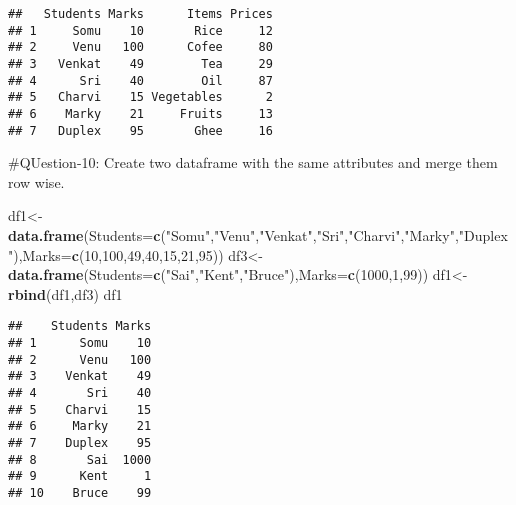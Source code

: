 \documentclass[
]{article}
\newenvironment{Shaded}{\begin{snugshade}}{\end{snugshade}}
\newcommand{\AttributeTok}[1]{\textcolor[rgb]{0.13,0.29,0.53}{#1}}
\newcommand{\DecValTok}[1]{\textcolor[rgb]{0.00,0.00,0.81}{#1}}
\newcommand{\FunctionTok}[1]{\textcolor[rgb]{0.13,0.29,0.53}{\textbf{#1}}}
\newcommand{\NormalTok}[1]{#1}
\newcommand{\OtherTok}[1]{\textcolor[rgb]{0.56,0.35,0.01}{#1}}
\newcommand{\StringTok}[1]{\textcolor[rgb]{0.31,0.60,0.02}{#1}}
\begin{document}
\begin{verbatim}
##   Students Marks      Items Prices
## 1     Somu    10       Rice     12
## 2     Venu   100      Cofee     80
## 3   Venkat    49        Tea     29
## 4      Sri    40        Oil     87
## 5   Charvi    15 Vegetables      2
## 6    Marky    21     Fruits     13
## 7   Duplex    95       Ghee     16
\end{verbatim}

\#QUestion-10: Create two dataframe with the same attributes and merge
them row wise.

\begin{Shaded}
\begin{Highlighting}[]
\NormalTok{df1}\OtherTok{\textless{}{-}}\FunctionTok{data.frame}\NormalTok{(}\AttributeTok{Students=}\FunctionTok{c}\NormalTok{(}\StringTok{"Somu"}\NormalTok{,}\StringTok{"Venu"}\NormalTok{,}\StringTok{"Venkat"}\NormalTok{,}\StringTok{"Sri"}\NormalTok{,}\StringTok{"Charvi"}\NormalTok{,}\StringTok{"Marky"}\NormalTok{,}\StringTok{"Duplex"}\NormalTok{),}\AttributeTok{Marks=}\FunctionTok{c}\NormalTok{(}\DecValTok{10}\NormalTok{,}\DecValTok{100}\NormalTok{,}\DecValTok{49}\NormalTok{,}\DecValTok{40}\NormalTok{,}\DecValTok{15}\NormalTok{,}\DecValTok{21}\NormalTok{,}\DecValTok{95}\NormalTok{))}
\NormalTok{df3}\OtherTok{\textless{}{-}}\FunctionTok{data.frame}\NormalTok{(}\AttributeTok{Students=}\FunctionTok{c}\NormalTok{(}\StringTok{"Sai"}\NormalTok{,}\StringTok{"Kent"}\NormalTok{,}\StringTok{"Bruce"}\NormalTok{),}\AttributeTok{Marks=}\FunctionTok{c}\NormalTok{(}\DecValTok{1000}\NormalTok{,}\DecValTok{1}\NormalTok{,}\DecValTok{99}\NormalTok{))}
\NormalTok{df1}\OtherTok{\textless{}{-}}\FunctionTok{rbind}\NormalTok{(df1,df3)}
\NormalTok{df1}
\end{Highlighting}
\end{Shaded}

\begin{verbatim}
##    Students Marks
## 1      Somu    10
## 2      Venu   100
## 3    Venkat    49
## 4       Sri    40
## 5    Charvi    15
## 6     Marky    21
## 7    Duplex    95
## 8       Sai  1000
## 9      Kent     1
## 10    Bruce    99
\end{verbatim}
\end{document}
